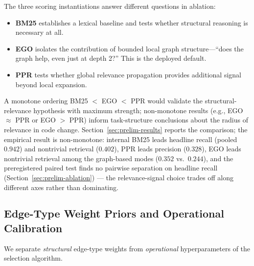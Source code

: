 \documentclass[11pt, a4paper]{article}
\begin{document}
The three scoring instantiations answer different questions in ablation:
\begin{itemize}
    \item \textbf{BM25} establishes a lexical baseline and tests whether structural reasoning is necessary at all.
    \item \textbf{EGO} isolates the contribution of bounded local graph structure---``does the graph help, even just at depth 2?'' This is the deployed default.
    \item \textbf{PPR} tests whether global relevance propagation provides additional signal beyond local expansion.
\end{itemize}
A monotone ordering BM25 $<$ EGO $<$ PPR would validate the structural-relevance hypothesis with maximum strength; non-monotone results (e.g., EGO $\approx$ PPR or EGO $>$ PPR) inform task-structure conclusions about the radius of relevance in code change. Section~\ref{sec:prelim-results} reports the comparison; the empirical result is non-monotone: internal BM25 leads headline recall (pooled $0.942$) and nontrivial retrieval ($0.402$), PPR leads precision ($0.328$), EGO leads nontrivial retrieval among the graph-based modes ($0.352$ vs.\ $0.244$), and the preregistered paired test finds no pairwise separation on headline recall (Section~\ref{sec:prelim-ablation}) --- the relevance-signal choice trades off along different axes rather than dominating.

\subsection{Edge-Type Weight Priors and Operational Calibration}
\label{sec:weight-calibration}

We separate \emph{structural} edge-type weights from \emph{operational} hyperparameters of the selection algorithm.
\end{document}
